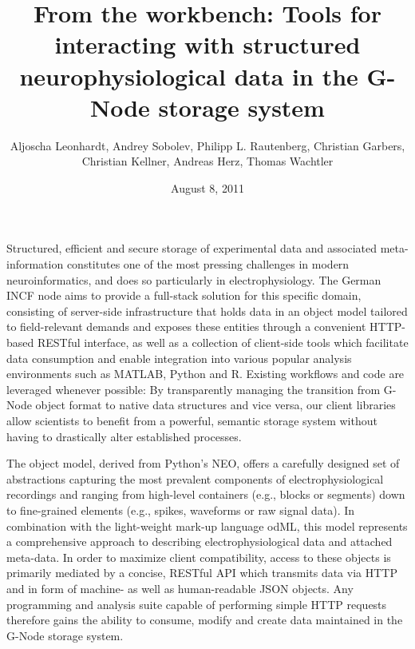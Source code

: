 \documentclass[a4paper]{article}
\begin{document}
\title{From the workbench: Tools for interacting with structured
  neurophysiological data in the G-Node storage system}

\author{

  Aljoscha Leonhardt,
  Andrey Sobolev,
  Philipp L. Rautenberg,
  Christian Garbers,
  Christian Kellner,
  Andreas Herz,
  Thomas Wachtler

}
\date{August 8, 2011}

\maketitle


Structured, efficient and secure storage of experimental data and
associated meta-information constitutes one of the most pressing
challenges in modern neuroinformatics, and does so particularly in
electrophysiology. The German INCF node aims to provide a full-stack
solution for this specific domain, consisting of server-side
infrastructure that holds data in an object model tailored to
field-relevant demands and exposes these entities through a convenient
HTTP-based RESTful interface, as well as a collection of client-side
tools which facilitate data consumption and enable integration into
various popular analysis environments such as MATLAB, Python and
R. Existing workflows and code are leveraged whenever possible: By
transparently managing the transition from G-Node object format to
native data structures and vice versa, our client libraries allow
scientists to benefit from a powerful, semantic storage system without
having to drastically alter established processes.

The object model, derived from Python's NEO, offers a carefully
designed set of abstractions capturing the most prevalent components
of electrophysiological recordings and ranging from high-level
containers (e.g., blocks or segments) down to fine-grained elements
(e.g., spikes, waveforms or raw signal data). In combination with the
light-weight mark-up language odML, this model represents a
comprehensive approach to describing electrophysiological data and
attached meta-data. In order to maximize client compatibility, access
to these objects is primarily mediated by a concise, RESTful API which
transmits data via HTTP and in form of machine- as well as
human-readable JSON objects. Any programming and analysis suite
capable of performing simple HTTP requests therefore gains the ability
to consume, modify and create data maintained in the G-Node storage
system.
\end{document}
